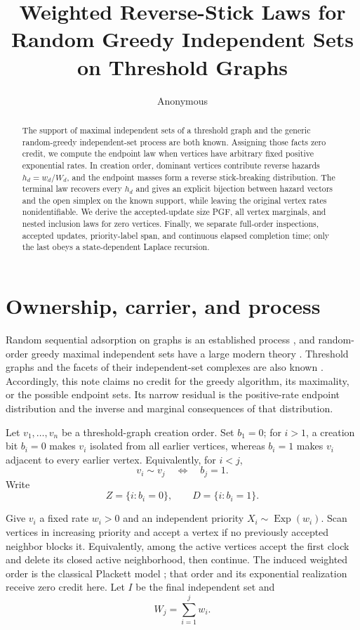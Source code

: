 \documentclass[10pt,a4paper]{amsart}
\title{Weighted Reverse-Stick Laws for Random Greedy Independent Sets on Threshold Graphs}
\author{Anonymous}
\date{}
\theoremstyle{remark}
\newcommand{\Exp}{\operatorname{Exp}}
\begin{document}
\begin{abstract}
The support of maximal independent sets of a threshold graph and the generic
random-greedy independent-set process are both known.  Assigning those facts
zero credit, we compute the endpoint law when vertices have arbitrary fixed
positive exponential rates.  In creation order, dominant vertices contribute
reverse hazards $h_d=w_d/W_d$, and the endpoint masses form a reverse
stick-breaking distribution.  The terminal law recovers every $h_d$ and gives
an explicit bijection between hazard vectors and the open simplex on the known
support, while leaving the original vertex rates nonidentifiable.  We derive
the accepted-update size PGF, all vertex marginals, and nested inclusion laws
for zero vertices.  Finally, we separate full-order inspections, accepted
updates, priority-label span, and continuous elapsed completion time; only the
last obeys a state-dependent Laplace recursion.
\end{abstract}

\maketitle

\section{Ownership, carrier, and process}

Random sequential adsorption on graphs is an established process
\citep{pippenger1989}, and random-order greedy maximal independent sets have a
large modern theory \citep{krivelevichetal2024}.  Threshold graphs and the
facets of their independent-set complexes are also known
\citep{klivans2007}.  Accordingly, this note claims no credit for the greedy
algorithm, its maximality, or the possible endpoint sets.  Its narrow residual
is the positive-rate endpoint distribution and the inverse and marginal
consequences of that distribution.

Let $v_1,\ldots,v_n$ be a threshold-graph creation order.  Set $b_1=0$; for
$i>1$, a creation bit $b_i=0$ makes $v_i$ isolated from all earlier vertices,
whereas $b_i=1$ makes $v_i$ adjacent to every earlier vertex.  Equivalently,
for $i<j$,
\begin{equation}\label{eq:adjacency}
 v_i\sim v_j\quad\Longleftrightarrow\quad b_j=1.
\end{equation}
Write
\[
 Z=\{i:b_i=0\},\qquad D=\{i:b_i=1\}.
\]

Give $v_i$ a fixed rate $w_i>0$ and an independent priority
$X_i\sim\Exp(w_i)$.  Scan vertices in increasing priority and accept a vertex
if no previously accepted neighbor blocks it.  Equivalently, among the active
vertices accept the first clock and delete its closed active neighborhood,
then continue.  The induced weighted order is the classical Plackett model
\citep{plackett1975}; that order and its exponential realization receive zero
credit here.  Let $I$ be the final independent set and
\begin{equation}\label{eq:prefix}
 W_j=\sum_{i=1}^j w_i.
\end{equation}
\end{document}
